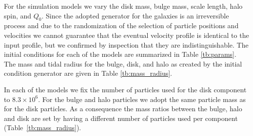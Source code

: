 For the simulation models we vary the disk mass, bulge mass,
scale length, halo spin, and $Q_0$.  Since the adopted generator for
the galaxies is an irreversible process and due to the randomization
of the selection of particle positions and velocities we cannot
guarantee that the eventual velocity profile is identical to the input
profile, but we confirmed by inspection that they are
indistinguishable.  The initial conditions for each of the models are
summarized in Table \ref{tb:params}.  The mass and tidal radius for
the bulge, disk, and halo as created by the initial condition
generator are given in Table \ref{tb:mass_radius}.

In each of the models we fix  the number of particles used for 
the disk component to $8.3 \times 10^6$. For the bulge and halo
particles we adopt the same particle mass as for the disk particles.
As a consequence the mass ratios between the bulge, halo and disk are
set by having a different number of particles 
used per component (Table~\ref{tb:mass_radius}).


